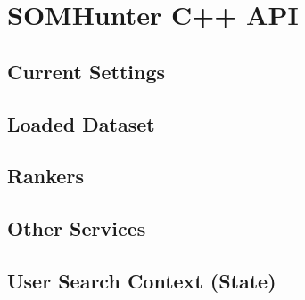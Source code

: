 \chapter{SOMHunter C++ API}
\label{comp-cpp-api}

\section{Current Settings}

\section{Loaded Dataset}

\section{Rankers}

\section{Other Services}

\section{User Search Context (State)}

